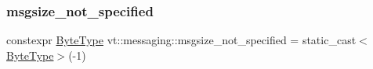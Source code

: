\mbox{\label{namespacevt_1_1messaging_adefd943a6421b1b7120526f969bee20f}} 
\subsubsection{\texorpdfstring{msgsize\+\_\+not\+\_\+specified}{msgsize\_not\_specified}}
{\footnotesize\ttfamily constexpr \hyperlink{namespacevt_aab8d55968084610ce3b17057981e9300}{Byte\+Type} vt\+::messaging\+::msgsize\+\_\+not\+\_\+specified = static\+\_\+cast$<$\hyperlink{namespacevt_aab8d55968084610ce3b17057981e9300}{Byte\+Type}$>$(-\/1)}

